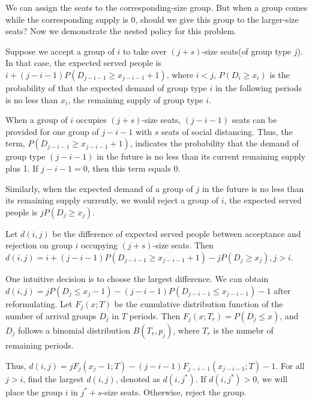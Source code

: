 We can assign the seats to the corresponding-size group. But when a group comes while the corresponding supply is 0, should we give this group to the larger-size seats? Now we demonstrate the nested policy for this problem.

Suppose we accept a group of $i$ to take over $(j+s)$-size seats(of group type $j$). In that case, the expected served people is $i + (j-i-1)P(D_{j-i-1} \geq x_{j-i-1}+1)$, where $i < j$, $P(D_i \geq x_i)$ is the probability of that the expected demand of group type $i$ in the following periods is no less than $x_i$, the remaining supply of group type $i$.

When a group of $i$ occupies $(j+s)$-size seats, $(j-i-1)$ seats can be provided for one group of $j-i-1$ with $s$ seats of social distancing.
Thus, the term, $P(D_{j-i-1} \geq x_{j-i-1}+1)$, indicates the probability that the demand of group type $(j-i-1)$ in the future is no less than its current remaining supply plus 1. If $j -i- 1 =0$, then this term equals 0.

Similarly, when the expected demand of a group of $j$ in the future is no less than its remaining supply currently, we would reject a group of $i$, the expected served people is $j P(D_{j} \geq x_{j})$.

Let $d(i,j)$ be the difference of expected served people between acceptance and rejection on group $i$ occupying $(j+s)$-size seats. Then $d(i,j) = i + (j-i-1)P(D_{j-i-1} \geq x_{j-i-1}+1) - j P(D_{j} \geq x_{j}), j >i$.

One intuitive decision is to choose the largest difference.
We can obtain $d(i,j) = j P(D_{j} \leq x_{j} -1) - (j-i-1)P(D_{j-i-1} \leq x_{j-i-1}) -1$ after reformulating. Let $F_{j}(x;T)$ be the cumulative distribution function of the number of arrival groups $D_{j}$ in $T$ periods. Then $F_{j}(x; T_{r}) = P(D_{j} \leq x)$, and $D_{j}$ follows a binomial distribution $B(T_{r}, p_{j})$, where $T_{r}$ is the numebr of remaining periods.

Thus, $d(i,j) = j F_{j}(x_{j}-1; T) - (j-i-1) F_{j-i-1}(x_{j-i-1}; T) -1$. For all $j >i$, find the largest $d(i,j)$, denoted as $d(i,j^{*})$. If $d(i,j^{*}) >0$, we will place the group $i$ in $j^{*}+s$-size seats. Otherwise, reject the group.


